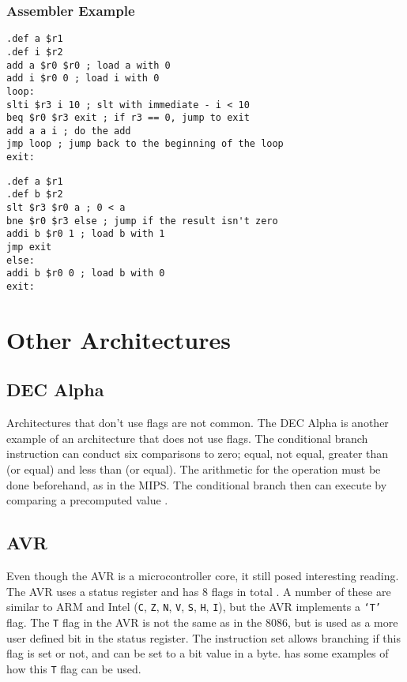 \documentclass[12pt,a4paper]{article}
\begin{document}
\begin{bibunit}[is-unsrt]
\subsubsection{Assembler Example}
\begin{lstlisting}[frame=single,caption=MIPS assembler for listing \ref{ListC},label=mips1]
.def a $r1
.def i $r2
add a $r0 $r0 ; load a with 0
add i $r0 0 ; load i with 0
loop:
slti $r3 i 10 ; slt with immediate - i < 10
beq $r0 $r3 exit ; if r3 == 0, jump to exit
add a a i ; do the add
jmp loop ; jump back to the beginning of the loop
exit:
\end{lstlisting}
\begin{lstlisting}[frame=single,caption=MIPS assembler for listing \ref{ListC2},label=mips2]
.def a $r1
.def b $r2
slt $r3 $r0 a ; 0 < a
bne $r0 $r3 else ; jump if the result isn't zero
addi b $r0 1 ; load b with 1
jmp exit
else:
addi b $r0 0 ; load b with 0
exit:
\end{lstlisting}

\section{Other Architectures}
\subsection{DEC Alpha}

Architectures that don't use flags are not common. 
The DEC Alpha is another example of an architecture that does not use flags.
The conditional branch instruction can conduct six comparisons to zero; equal, not equal, greater than (or equal) and less than (or equal).
The arithmetic for the operation must be done beforehand, as in the MIPS.
The conditional branch then can execute by comparing a precomputed value \cite{decalpha}. 


\subsection{AVR}
Even though the AVR is a microcontroller core, it still posed interesting reading. 
The AVR uses a status register and has 8 flags in total \cite{atmel:instructions}.
A number of these are similar to ARM and Intel (\texttt{C}, \texttt{Z}, \texttt{N}, \texttt{V}, \texttt{S}, \texttt{H}, \texttt{I}), but the AVR implements a \texttt{`T'} flag.
The \texttt{T} flag in the AVR is not the same as in the 8086, but is used as a more user defined bit in the status register.
The instruction set allows branching if this flag is set or not, and can be set to a bit value in a byte. 
\cite{avr:asm} has some examples of how this \texttt{T} flag can be used.



\end{bibunit}
\end{document}
